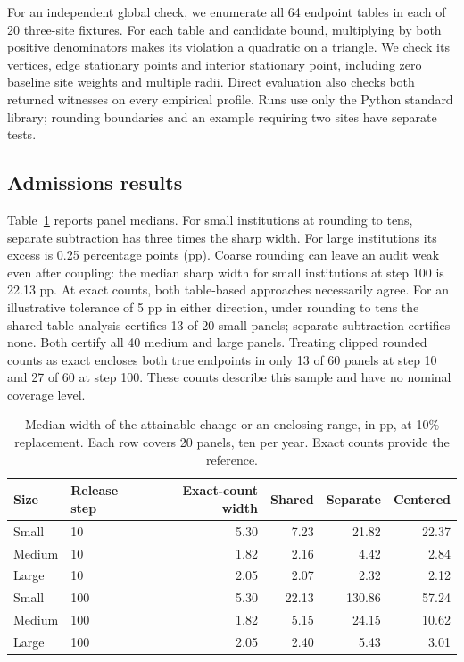 \documentclass[11pt]{article}
\begin{document}
For an independent global check, we enumerate all 64 endpoint tables in each of 20 three-site fixtures. For each table and candidate bound, multiplying by both positive denominators makes its violation a quadratic on a triangle. We check its vertices, edge stationary points and interior stationary point, including zero baseline site weights and multiple radii. Direct evaluation also checks both returned witnesses on every empirical profile. Runs use only the Python standard library; rounding boundaries and an example requiring two sites have separate tests.

\subsection{Admissions results}
Table~\ref{tab:main} reports panel medians. For small institutions at rounding to tens, separate subtraction has three times the sharp width. For large institutions its excess is 0.25 percentage points (pp). Coarse rounding can leave an audit weak even after coupling: the median sharp width for small institutions at step 100 is 22.13 pp. At exact counts, both table-based approaches necessarily agree. For an illustrative tolerance of 5 pp in either direction, under rounding to tens the shared-table analysis certifies 13 of 20 small panels; separate subtraction certifies none. Both certify all 40 medium and large panels. Treating clipped rounded counts as exact encloses both true endpoints in only 13 of 60 panels at step 10 and 27 of 60 at step 100. These counts describe this sample and have no nominal coverage level.

\begin{table}[ht]
\centering
\caption{Median width of the attainable change or an enclosing range, in pp, at 10\% replacement. Each row covers 20 panels, ten per year. Exact counts provide the reference.}
\label{tab:main}
\begin{tabular}{llrrrr}
\toprule
Size & Release step & Exact-count width & Shared & Separate & Centered\\
\midrule
Small & 10 & 5.30 & 7.23 & 21.82 & 22.37\\
Medium & 10 & 1.82 & 2.16 & 4.42 & 2.84\\
Large & 10 & 2.05 & 2.07 & 2.32 & 2.12\\
Small & 100 & 5.30 & 22.13 & 130.86 & 57.24\\
Medium & 100 & 1.82 & 5.15 & 24.15 & 10.62\\
Large & 100 & 2.05 & 2.40 & 5.43 & 3.01\\
\bottomrule
\end{tabular}
\end{table}
\end{document}
